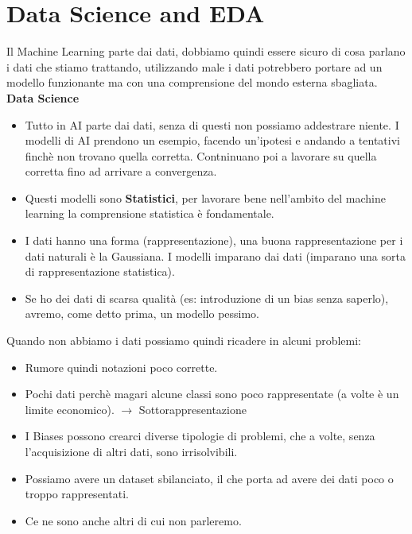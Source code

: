 \documentclass[a4paper,12pt]{article}
\begin{document}
\section{Data Science and EDA}
Il Machine Learning parte dai dati, dobbiamo quindi essere sicuro di cosa parlano i dati che stiamo trattando, utilizzando male i dati
potrebbero portare ad un modello funzionante ma con una comprensione del mondo esterna sbagliata.
\textbf{Data Science}
\begin{itemize}
    \item Tutto in AI parte dai dati, senza di questi non possiamo addestrare niente. I modelli di AI prendono un esempio, facendo un'ipotesi e andando a tentativi finchè non trovano quella corretta. Contninuano poi a lavorare su quella corretta fino ad arrivare a convergenza. 
    \item Questi modelli sono \textbf{Statistici}, per lavorare bene nell'ambito del machine learning la comprensione statistica è fondamentale.
    \item I dati hanno una forma (rappresentazione), una buona rappresentazione per i dati naturali è la Gaussiana. I modelli imparano dai dati (imparano una sorta di rappresentazione statistica).
    \item Se ho dei dati di scarsa qualità (es: introduzione di un bias senza saperlo), avremo, come detto prima, un modello pessimo.
\end{itemize}
Quando non abbiamo i dati possiamo quindi ricadere in alcuni problemi:
\begin{itemize}
    \item Rumore quindi notazioni poco corrette.
    \item Pochi dati perchè magari alcune classi sono poco rappresentate (a volte è un limite economico). $\rightarrow$ Sottorappresentazione
    \item I Biases possono crearci diverse tipologie di problemi, che a volte, senza l'acquisizione di altri dati, sono irrisolvibili.
    \item Possiamo avere un dataset sbilanciato, il che porta ad avere dei dati poco o troppo rappresentati.
    \item Ce ne sono anche altri di cui non parleremo.
\end{itemize}
\end{document}
